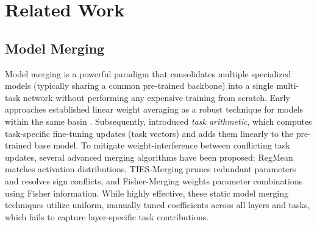 \section{Related Work}
\label{sec:related_work}

\subsection{Model Merging}
Model merging is a powerful paradigm that consolidates multiple specialized models (typically sharing a common pre-trained backbone) into a single multi-task network without performing any expensive training from scratch. 
Early approaches established linear weight averaging as a robust technique for models within the same basin \cite{neyshabur2020shared, entezari2021role, wortsman2022model}. 
Subsequently, \citet{ilharco2022editing} introduced \emph{task arithmetic}, which computes task-specific fine-tuning updates (task vectors) and adds them linearly to the pre-trained base model. 
To mitigate weight-interference between conflicting task updates, several advanced merging algorithms have been proposed: RegMean \cite{jin2023regmean} matches activation distributions, TIES-Merging \cite{yadav2023resolving} prunes redundant parameters and resolves sign conflicts, and Fisher-Merging \cite{matena2022merging} weights parameter combinations using Fisher information. 
While highly effective, these static model merging techniques utilize uniform, manually tuned coefficients across all layers and tasks, which fails to capture layer-specific task contributions.

